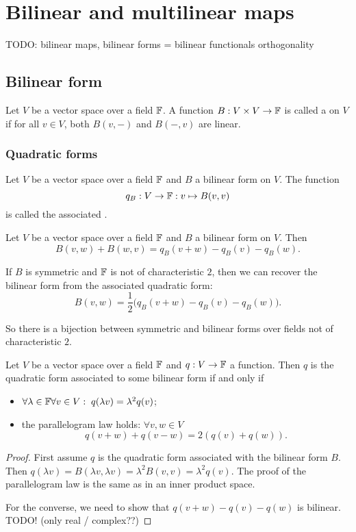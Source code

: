 \chapter{Bilinear and multilinear maps}
TODO: bilinear maps, bilinear forms = bilinear functionals
orthogonality

\section{Bilinear form}
\begin{definition}
Let $V$ be a vector space over a field $\mathbb{F}$. A function $B:V\times V\to \mathbb{F}$ is called a  on $V$ if for all $v\in V$, both $B(v,-)$ and $B(-,v)$ are linear.
\end{definition}

\subsection{Quadratic forms}
\begin{definition}
Let $V$ be a vector space over a field $\mathbb{F}$ and $B$ a bilinear form on $V$. The function
\[ q_B: V\to \mathbb{F}: v\mapsto B(v,v) \]
is called the associated .
\end{definition}

\begin{proposition}
Let $V$ be a vector space over a field $\mathbb{F}$ and $B$ a bilinear form on $V$. Then
\[ B(v,w) + B(w,v) = q_B(v+w) - q_B(v) - q_B(w). \]
\end{proposition}
\begin{corollary}
If $B$ is symmetric and $\mathbb{F}$ is not of characteristic $2$, then we can recover the bilinear form from the associated quadratic form:
\[ B(v,w) = \frac{1}{2}\Big(q_B(v+w) - q_B(v) - q_B(w)\Big). \]
\end{corollary}
So there is a bijection between symmetric and bilinear forms over fields not of characteristic $2$.

\begin{proposition}
Let $V$ be a vector space over a field $\mathbb{F}$ and $q: V\to \mathbb{F}$ a function. Then $q$ is the quadratic form associated to some bilinear form \textup{if and only if}
\begin{itemize}
    \item $\forall \lambda \in \mathbb{F}\forall v\in V: \; q(\lambda v) = \lambda^2 q(v)$;
    \item the parallelogram law holds: $\forall v,w\in V$
    \[ q(v+w) + q(v-w) = 2(q(v)+q(w)). \]
\end{itemize}
\end{proposition}
\begin{proof}
First assume $q$ is the quadratic form associated with the bilinear form $B$. Then $q(\lambda v) = B(\lambda v, \lambda v) = \lambda^2 B(v,v) = \lambda^2 q(v)$. The proof of the parallelogram law is the same as in an inner product space.

For the converse, we need to show that $q(v+w) - q(v) - q(w)$ is bilinear. TODO! (only real / complex??)
\end{proof}

